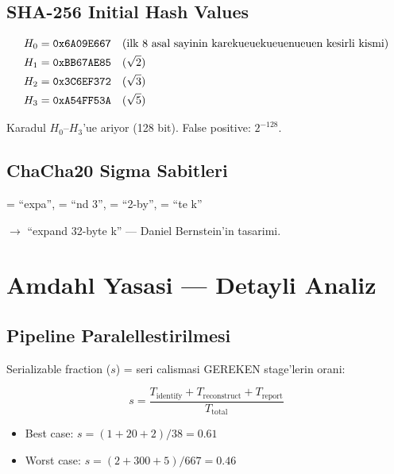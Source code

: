 \subsection{SHA-256 Initial Hash Values}

\begin{align}
H_0 &= \texttt{0x6A09E667} && \text{(ilk 8 asal sayinin karekueuekueuenueuen kesirli kismi)} \notag \\
H_1 &= \texttt{0xBB67AE85} && (\sqrt{2}) \notag \\
H_2 &= \texttt{0x3C6EF372} && (\sqrt{3}) \notag \\
H_3 &= \texttt{0xA54FF53A} && (\sqrt{5}) \notag
\end{align}

Karadul $H_0$--$H_3$'ue ariyor (128 bit). False positive: $2^{-128}$.

\subsection{ChaCha20 Sigma Sabitleri}

 = ``expa'',  = ``nd 3'',  = ``2-by'',  = ``te k''

$\to$ ``expand 32-byte k'' --- Daniel Bernstein'in tasarimi.



\section{Amdahl Yasasi --- Detayli Analiz}
\label{sec:amdahl-deep}

\subsection{Pipeline Paralellestirilmesi}

Serializable fraction ($s$) = seri calismasi GEREKEN stage'lerin orani:

\begin{equation}
s = \frac{T_{\text{identify}} + T_{\text{reconstruct}} + T_{\text{report}}}{T_{\text{total}}}
\end{equation}

\begin{itemize}
\item Best case: $s = (1 + 20 + 2) / 38 = 0.61$
\item Worst case: $s = (2 + 300 + 5) / 667 = 0.46$
\end{itemize}

